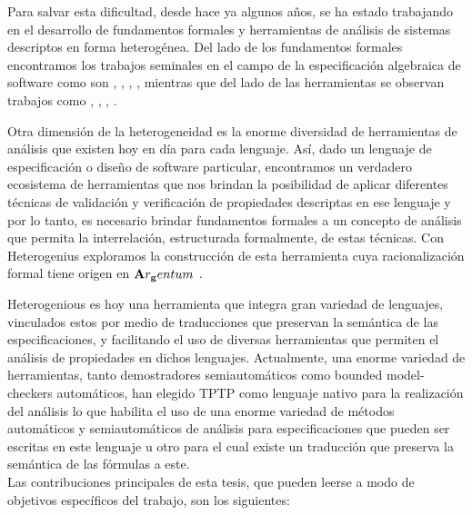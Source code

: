 Para salvar esta dificultad, desde hace ya algunos años, se ha estado trabajando en el desarrollo de fundamentos formales y herramientas de análisis de sistemas descriptos en forma heterogénea. Del lado de los fundamentos formales encontramos los trabajos seminales en el campo de la especificación algebraica de software como son \cite{GB84}, \cite{GB92}, \cite{Tar96}, \cite{Dia02}, mientras que del lado de las herramientas se observan trabajos como \cite{Mos02}, \cite{DF96}, \cite{DF02}, \cite{LF06}. 

Otra dimensión de la heterogeneidad es la enorme diversidad de herramientas de análisis que existen hoy en día para cada lenguaje. Así, dado un lenguaje de especificación o diseño de software particular, encontramos un verdadero ecosistema de herramientas que nos brindan la posibilidad de aplicar diferentes técnicas de validación y verificación de propiedades descriptas en ese lenguaje y por lo tanto, es necesario brindar fundamentos formales a un concepto de análisis que permita la interrelación, estructurada formalmente, de estas técnicas. Con Heterogenius \cite{heterogenius} exploramos la construcción de esta herramienta cuya racionalización formal tiene origen en ${\bf A}r_{\bf g}entum$ \cite{frias:relmics01}.

Heterogenious es hoy una herramienta que integra gran variedad de lenguajes, vinculados estos por medio de traducciones que preservan la semántica de las especificaciones, y facilitando el uso de diversas herramientas que permiten el análisis de propiedades en dichos lenguajes. Actualmente, una enorme variedad de herramientas, tanto demostradores semiautomáticos como bounded model-checkers automáticos, han elegido TPTP \cite{tptp} como lenguaje nativo para la realización del análisis lo que habilita el uso de una enorme variedad de métodos automáticos y semiautomáticos de análisis para especificaciones que pueden ser escritas en este lenguaje u otro para el cual existe un traducción que preserva la semántica de las fórmulas a este.\\

Las contribuciones principales de esta tesis, que pueden leerse a modo de objetivos específicos del trabajo, son los siguientes:

